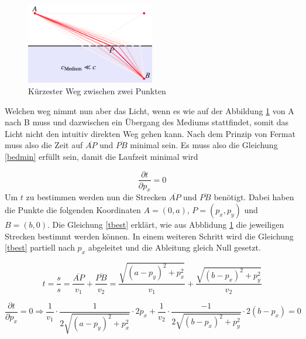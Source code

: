 \begin{refsection}
\begin{figure}
  \centering
  \includegraphics[width=0.5\textwidth]{adaptiv/images/Weg}
  \caption{Kürzester Weg zwischen zwei Punkten}
  \label{fig:weg}
\end{figure}

Welchen weg nimmt nun aber das Licht, wenn es wie auf der Abbildung \ref{fig:weg} von A nach B muss und dazwischen ein Übergang des Mediums stattfindet, somit das Licht nicht den intuitiv direkten Weg gehen kann. Nach dem Prinzip von Fermat muss also die Zeit auf $\overline{AP}$ und $\overline{PB}$ minimal sein. Es muss also die Gleichung \eqref{bedmin} erfüllt sein, damit die Laufzeit minimal wird

\begin{equation}\label{bedmin}
\dfrac{\partial t}{\partial p_{x}}=0
\end{equation}
Um $t$ zu bestimmen werden nun die Strecken $\overline{AP}$ und $\overline{PB}$ benötigt. Dabei haben die Punkte die folgenden Koordinaten $A = (0,a)$, $P=(p_{x},p_{y})$ und $B=(b,0)$. Die Gleichung \eqref{tbest} erklärt, wie aus Abblidung \ref{fig:weg} die jeweiligen Strecken bestimmt werden können. In einem weiteren Schritt wird die Gleichung \eqref{tbest} partiell nach $p_{x}$ abgeleitet und die Ableitung gleich Null gesetzt.

\begin{equation}\label{tbest}
t=\dfrac{s}{s}=\dfrac{\overline{AP}}{v_{1}}+\dfrac{\overline{PB}}{v_{2}}= 
\dfrac{\sqrt{(a-p_{y})^{2}+p_{x}^{2}}}{v_{1}}+ 
\dfrac{\sqrt{(b-p_{x})^{2}+p_{y}^{2}}}{v_{2}}
\end{equation}

\begin{equation}\label{partdiff}
\dfrac{\partial t}{\partial p_{x}}=0 \Rightarrow 
\dfrac{1}{v_{1}}\cdot \dfrac{1}{2 \sqrt{(a-p_{y})^{2}+p_{x}^{2}}}\cdot 2p_{x} +
\dfrac{1}{v_{2}}\cdot \dfrac{-1}{2 \sqrt{(b-p_{x})^{2}+p_{y}^{2}}}\cdot 2(b-p_{x})= 0
\end{equation}


\end{refsection}
